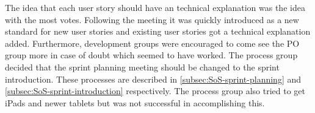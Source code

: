 The idea that each user story should have an technical explanation was the idea with the most votes. 
Following the meeting it was quickly introduced as a new standard for new user stories and existing user stories got a technical explanation added.
Furthermore, development groups were encouraged to come see the PO group more in case of doubt which seemed to have worked.
The process group decided that the sprint planning meeting should be changed to the sprint introduction.
These processes are described in \autoref{subsec:SoS-sprint-planning} and \autoref{subsec:SoS-sprint-introduction} respectively.
The process group also tried to get iPads and newer tablets but was not successful in accomplishing this.
